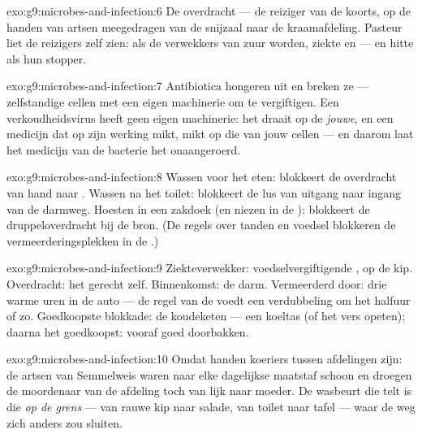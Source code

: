 \begin{solution}{exo:g9:microbes-and-infection:6}
De overdracht --- de reiziger van de koorts, op de handen van
artsen meegedragen van de snijzaal naar de kraamafdeling. Pasteur
liet de reizigers zelf zien:  als de verwekkers van zuur
worden, ziekte en  --- en hitte als hun stopper.
\end{solution}

\begin{solution}{exo:g9:microbes-and-infection:7}
Antibiotica hongeren  uit en breken ze --- zelfstandige
cellen met een eigen machinerie om te vergiftigen. Een
verkoudheidsvirus heeft geen eigen machinerie: het draait op de
\emph{jouwe}, en een medicijn dat op zijn werking mikt, mikt op die
van jouw cellen --- en daarom laat het medicijn van de bacterie het
 onaangeroerd.
\end{solution}

\begin{solution}{exo:g9:microbes-and-infection:8}
Wassen voor het eten: blokkeert de overdracht van hand naar .
Wassen na het toilet: blokkeert de lus van uitgang naar ingang van
de darmweg. Hoesten in een zakdoek (en niezen in de ):
blokkeert de druppeloverdracht bij de bron. (De regels over tanden
en voedsel blokkeren de vermeerderingsplekken in de .)
\end{solution}

\begin{solution}{exo:g9:microbes-and-infection:9}
Ziekteverwekker: voedselvergiftigende , op de kip.
Overdracht: het gerecht zelf. Binnenkomst: de darm. Vermeerderd
door: drie warme uren in de auto --- de regel van de
 voedt een verdubbeling om het halfuur of zo.
Goedkoopste blokkade: de koudeketen --- een koeltas (of het vers
opeten); daarna het goedkoopst: vooraf goed doorbakken.
\end{solution}

\begin{solution}{exo:g9:microbes-and-infection:10}
Omdat handen koeriers tussen afdelingen zijn: de artsen van
Semmelweis waren naar elke dagelijkse maatstaf schoon en droegen de
moordenaar van de afdeling toch van lijk naar moeder. De wasbeurt
die telt is die \emph{op de grens} --- van rauwe kip naar salade,
van toilet naar tafel --- waar de weg zich anders zou sluiten.
\end{solution}


